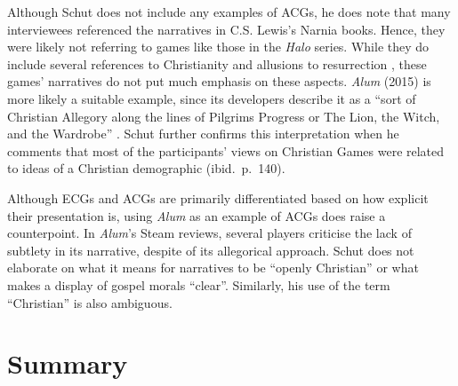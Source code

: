 Although Schut does not include any examples of \acp{ACG}, he does note that many interviewees referenced the narratives in C.S. Lewis's Narnia books. Hence, they were likely not referring to games like those in the \textit{Halo} series. While they do include several references to Christianity and allusions to resurrection \parencite{paulissen_dark_2018}, these games' narratives do not put much emphasis on these aspects. \textit{Alum} (2015) is more likely a suitable example, since its developers describe it as a ``sort of Christian Allegory along the lines of Pilgrims Progress or The Lion, the Witch, and the Wardrobe'' \parencite{crashable_studios_alum_2015}. Schut further confirms this interpretation when he comments that most of the participants' views on Christian Games were related to ideas of a Christian demographic (ibid.~p.~140).

Although \acp{ECG} and \acp{ACG} are primarily differentiated based on how explicit their presentation is, using \textit{Alum} as an example of \acp{ACG} does raise a counterpoint. In \textit{Alum}'s Steam reviews, several players criticise the lack of subtlety in its narrative, despite of its allegorical approach. Schut does not elaborate on what it means for narratives to be ``openly Christian'' or what makes a display of gospel morals ``clear''. Similarly, his use of the term ``Christian'' is also ambiguous.

\section{Summary}
\blindtext
